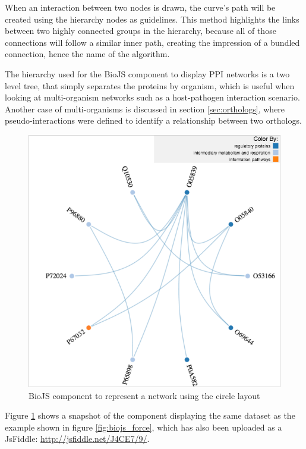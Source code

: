 When an interaction between two nodes is drawn, the curve's path will be created using the hierarchy nodes as guidelines. This method highlights the links between two highly connected groups in the hierarchy, because all of those connections will follow a similar inner path, creating the impression of a bundled connection, hence the name of the algorithm.

The hierarchy used for the BioJS component to display PPI networks is a two level tree, that simply separates the proteins by organism, which is useful when looking at multi-organism networks such as a host-pathogen interaction scenario. Another case of multi-organisms is discussed in section \ref{sec:orthologs}, where pseudo-interactions were defined to identify a relationship between two orthologs.

\begin{figure}[ht]
\centering
\includegraphics[width=5in]{figures/circle.png}
\caption[BioJS component to represent a network using the circle layout]{BioJS component to represent a network using the circle layout
\label{fig:biojs_circle}}
\end{figure}

Figure \ref{fig:biojs_circle} shows a snapshot of the component displaying the same dataset as the example shown in figure \ref{fig:biojs_force}, which has also been uploaded as a JsFiddle: \url{http://jsfiddle.net/J4CE7/9/}.

